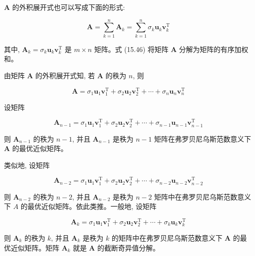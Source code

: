\documentclass[10pt]{article}
\begin{document}
$\boldsymbol{A}$ 的外积展开式也可以写成下面的形式:


\begin{equation*}
\boldsymbol{A}=\sum_{k=1}^{n} \boldsymbol{A}_{k}=\sum_{k=1}^{n} \sigma_{k} \boldsymbol{u}_{k} \boldsymbol{v}_{k}^{\mathrm{T}} \tag{15.46}
\end{equation*}


其中, $\boldsymbol{A}_{k}=\sigma_{k} \boldsymbol{u}_{k} \boldsymbol{v}_{k}^{\mathrm{T}}$ 是 $m \times n$ 矩阵。式 (15.46) 将矩阵 $\boldsymbol{A}$ 分解为矩阵的有序加权和。

由矩阵 $\boldsymbol{A}$ 的外积展开式知, 若 $\boldsymbol{A}$ 的秩为 $n$, 则


\begin{equation*}
\boldsymbol{A}=\sigma_{1} \boldsymbol{u}_{1} \boldsymbol{v}_{1}^{\mathrm{T}}+\sigma_{2} \boldsymbol{u}_{2} \boldsymbol{v}_{2}^{\mathrm{T}}+\cdots+\sigma_{n} \boldsymbol{u}_{n} \boldsymbol{v}_{n}^{\mathrm{T}} \tag{15.47}
\end{equation*}


设矩阵

$$
\boldsymbol{A}_{n-1}=\sigma_{1} \boldsymbol{u}_{1} \boldsymbol{v}_{1}^{\mathrm{T}}+\sigma_{2} \boldsymbol{u}_{2} \boldsymbol{v}_{2}^{\mathrm{T}}+\cdots+\sigma_{n-1} \boldsymbol{u}_{n-1} \boldsymbol{v}_{n-1}^{\mathrm{T}}
$$

则 $\boldsymbol{A}_{n-1}$ 的秩为 $n-1$, 并且 $\boldsymbol{A}_{n-1}$ 是秩为 $n-1$ 矩阵在弗罗贝尼乌斯范数意义下 $\boldsymbol{A}$ 的最优近似矩阵。

类似地, 设矩阵

$$
\boldsymbol{A}_{n-2}=\sigma_{1} \boldsymbol{u}_{1} \boldsymbol{v}_{1}^{\mathrm{T}}+\sigma_{2} \boldsymbol{u}_{2} \boldsymbol{v}_{2}^{\mathrm{T}}+\cdots+\sigma_{n-2} \boldsymbol{u}_{n-2} \boldsymbol{v}_{n-2}^{\mathrm{T}}
$$

则 $\boldsymbol{A}_{n-2}$ 的秩为 $n-2$, 并且 $\boldsymbol{A}_{n-2}$ 是秩为 $n-2$ 矩阵中在弗罗贝尼乌斯范数意义下 $A$ 的最优近似矩阵。依此类推。一般地, 设矩阵

$$
\boldsymbol{A}_{k}=\sigma_{1} \boldsymbol{u}_{1} \boldsymbol{v}_{1}^{\mathrm{T}}+\sigma_{2} \boldsymbol{u}_{2} \boldsymbol{v}_{2}^{\mathrm{T}}+\cdots+\sigma_{k} \boldsymbol{u}_{k} \boldsymbol{v}_{k}^{\mathrm{T}}
$$

则 $\boldsymbol{A}_{k}$ 的秩为 $k$, 并且 $\boldsymbol{A}_{k}$ 是秩为 $k$ 的矩阵中在弗罗贝尼乌斯范数意义下 $\boldsymbol{A}$ 的最优近似矩阵。矩阵 $\boldsymbol{A}_{k}$ 就是 $\boldsymbol{A}$ 的截断奇异值分解。
\end{document}
